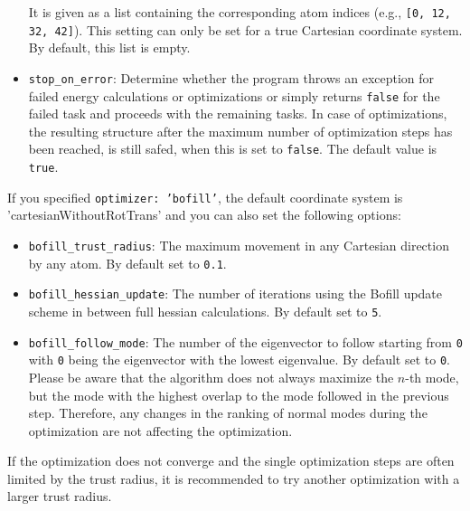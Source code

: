 \documentclass[]{tufte-book}
\begin{document}
\begin{itemize}
  It is given as a list containing the corresponding atom indices (e.g., \texttt{[0, 12, 32, 42]}). This setting can only be set for a true Cartesian coordinate system.
By default, this list is empty.
\item \texttt{stop\_on\_error}: Determine whether the program throws an exception for failed energy calculations or optimizations or simply returns \texttt{false} for the failed task and proceeds with the remaining tasks. In case of optimizations, the resulting structure after the maximum number of optimization steps has been reached, is still safed, when this is set to \texttt{false}. The default value is \texttt{true}.
\end{itemize}

If you specified \texttt{optimizer: 'bofill'}, the default coordinate system is 'cartesianWithoutRotTrans'
and you can also set the following options:
\begin{itemize}
\item \texttt{bofill\_trust\_radius}: The maximum movement in any Cartesian direction by any atom. By default set to \texttt{0.1}.
\item \texttt{bofill\_hessian\_update}: The number of iterations using the Bofill update scheme in between full hessian calculations.
By default set to \texttt{5}.
\item \texttt{bofill\_follow\_mode}: The number of the eigenvector to follow starting from \texttt{0} with \texttt{0} being the eigenvector with the lowest eigenvalue. By default set to \texttt{0}. Please be aware that the algorithm does not always maximize the $n$-th mode, but the mode with the highest overlap to the mode followed in the previous step. Therefore, any changes in the ranking of normal modes during the optimization are not affecting the optimization.
\end{itemize}
If the optimization does not converge and the single optimization steps are often limited by the trust radius, it is recommended to try another optimization with a larger trust radius.
\end{document}
